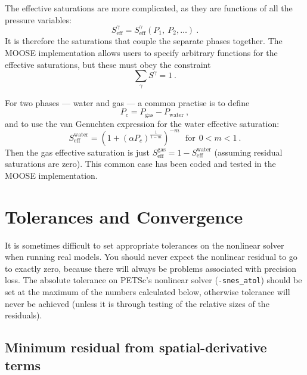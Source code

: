 \documentclass[]{scrreprt}
\begin{document}
The effective saturations are more complicated, as they are functions
of all the pressure variables:
\begin{equation}
S^{\gamma}_{\mathrm{eff}} =
S^{\gamma}_{\mathrm{eff}}(P_{1},\ P_{2},\ldots) \ .
\end{equation}
It is therefore the saturations that couple the separate phases
together.  The MOOSE implementation allows users to specify arbitrary
functions for the effective saturations, but these must obey the
constraint
\begin{equation}
\sum_{\gamma}S^{\gamma} = 1 \ .
\end{equation}

For two phases --- water and gas --- a common practise is to define
\begin{equation}
P_{c} = P_{\mathrm{gas}} - P_{\mathrm{water}} \ ,
\end{equation}
and to use the van Genuchten expression for the
water effective saturation:
\begin{equation}
S^{\mathrm{water}}_{\mathrm{eff}} = \left( 1 + (\alpha P_{c})^{\frac{1}{1 - m}}
\right)^{-m} \ \ \ \mbox{for}\ \ 0<m<1 \ .
\end{equation}
Then the gas effective saturation is just
$S^{\mathrm{gas}}_{\mathrm{eff}} = 1 -
S^{\mathrm{water}}_{\mathrm{eff}}$ (assuming residual saturations are
zero).  This common case has been coded and tested in the MOOSE implementation.





\chapter{Tolerances and Convergence}
\label{tol.chap}

It is sometimes difficult to set appropriate tolerances on the
nonlinear solver when running real models.  You should never expect
the nonlinear residual to go to exactly zero, because there will
always be problems associated with precision loss.  The absolute
tolerance on PETSc's nonlinear solver ({\tt{-snes\_atol}}) should be
set at the maximum of the numbers calculated below, otherwise
tolerance will never be achieved (unless it is through testing of the
relative sizes of the residuals).

\section{Minimum residual from spatial-derivative terms}
\label{sec.min.res.spat}
\end{document}
